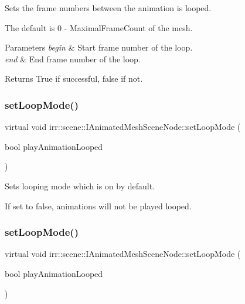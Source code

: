 Sets the frame numbers between the animation is looped. 

The default is 0 -\/ Maximal\+Frame\+Count of the mesh. 
\begin{DoxyParams}{Parameters}
{\em begin} & Start frame number of the loop. \\
\hline
{\em end} & End frame number of the loop. \\
\hline
\end{DoxyParams}
\begin{DoxyReturn}{Returns}
True if successful, false if not. 
\end{DoxyReturn}
\mbox{\label{classirr_1_1scene_1_1IAnimatedMeshSceneNode_ae6cae051c74c3953061aa9e49e10cd06}} 
\subsubsection{\texorpdfstring{set\+Loop\+Mode()}{setLoopMode()}\hspace{0.1cm}{\footnotesize\ttfamily [1/2]}}
{\footnotesize\ttfamily virtual void irr\+::scene\+::\+I\+Animated\+Mesh\+Scene\+Node\+::set\+Loop\+Mode (\begin{DoxyParamCaption}\item[{bool}]{play\+Animation\+Looped }\end{DoxyParamCaption})\hspace{0.3cm}{\ttfamily [pure virtual]}}



Sets looping mode which is on by default. 

If set to false, animations will not be played looped. \mbox{\label{classirr_1_1scene_1_1IAnimatedMeshSceneNode_ae6cae051c74c3953061aa9e49e10cd06}} 
\subsubsection{\texorpdfstring{set\+Loop\+Mode()}{setLoopMode()}\hspace{0.1cm}{\footnotesize\ttfamily [2/2]}}
{\footnotesize\ttfamily virtual void irr\+::scene\+::\+I\+Animated\+Mesh\+Scene\+Node\+::set\+Loop\+Mode (\begin{DoxyParamCaption}\item[{bool}]{play\+Animation\+Looped }\end{DoxyParamCaption})\hspace{0.3cm}{\ttfamily [pure virtual]}}



